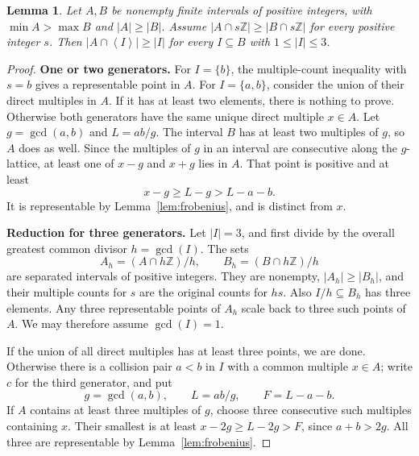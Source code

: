 \documentclass[11pt,a4paper]{article}
\numberwithin{equation}{section}
\newtheorem{lemma}[theorem]{Lemma}
\theoremstyle{remark}
\newcommand{\Z}{\mathbb Z}
\newcommand{\sg}[1]{\left\langle #1\right\rangle}
\begin{document}
\begin{lemma}\label{lem:three}
Let $A,B$ be nonempty finite intervals of positive integers, with
$\min A>\max B$ and $|A|\ge|B|$.
Assume $|A\cap s\Z|\ge|B\cap s\Z|$ for every positive integer $s$.
Then $|A\cap\sg{I}|\ge|I|$ for every $I\subseteq B$ with
$1\le|I|\le3$.
\end{lemma}

\begin{proof}
\textbf{One or two generators.}
For $I=\{b\}$, the multiple-count inequality with $s=b$ gives a
representable point in $A$.
For $I=\{a,b\}$, consider the union of their direct multiples in $A$.
If it has at least two elements, there is nothing to prove.
Otherwise both generators have the same unique direct multiple $x\in A$.
Let $g=\gcd(a,b)$ and $L=ab/g$.
The interval $B$ has at least two multiples of $g$, so $A$ does as well.
Since the multiples of $g$ in an interval are consecutive along the
$g$-lattice, at least one of $x-g$ and $x+g$ lies in $A$.
That point is positive and at least
\[
  x-g\ge L-g>L-a-b.
\]
It is representable by Lemma~\ref{lem:frobenius}, and is distinct
from $x$.

\textbf{Reduction for three generators.}
Let $|I|=3$, and first divide by the overall greatest common divisor
$h=\gcd(I)$.
The sets
\[
  A_h=(A\cap h\Z)/h,\qquad B_h=(B\cap h\Z)/h
\]
are separated intervals of positive integers. They are nonempty,
$|A_h|\ge|B_h|$, and their multiple counts for $s$ are the original
counts for $hs$.
Also $I/h\subseteq B_h$ has three elements.
Any three representable points of $A_h$ scale back to three such points
of $A$. We may therefore assume $\gcd(I)=1$.

If the union of all direct multiples has at least three points,
we are done. Otherwise there is a collision pair $a<b$ in $I$ with
a common multiple $x\in A$; write $c$ for the third generator, and put
\[
  g=\gcd(a,b),\qquad L=ab/g,\qquad F=L-a-b.
\]
If $A$ contains at least three multiples of $g$, choose three
consecutive such multiples containing $x$.
Their smallest is at least $x-2g\ge L-2g>F$, since $a+b>2g$.
All three are representable by Lemma~\ref{lem:frobenius}.


\end{proof}
\end{document}
